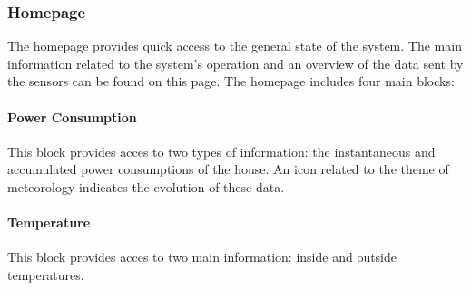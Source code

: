     \begin{figure}[!h] 
        \centering
    \end{figure}

     
\subsubsection{Homepage}

The homepage provides quick access to the general state of the system.
The main information related to the system's operation and an overview of the data sent by the sensors can be found on this page.
The homepage includes four main blocks:%
    \paragraph{Power Consumption} 
    This block provides acces to two types of information: the instantaneous and accumulated power consumptions of the house. An icon related to the theme of meteorology indicates the evolution of these data. %
    \paragraph{Temperature}
    This block provides acces to two main information: inside and outside temperatures.
